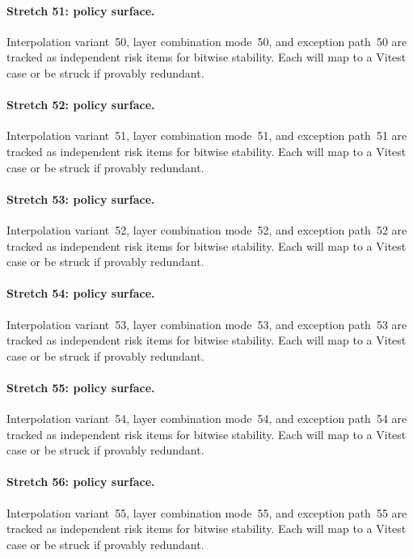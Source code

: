 \documentclass[sigconf,nonacm]{acmart}
\begin{document}
\paragraph{Stretch 51: policy surface.}
Interpolation variant~50, layer combination mode~50, and exception path~50 are tracked as independent risk items for bitwise stability. Each will map to a Vitest case or be struck if provably redundant. %

\paragraph{Stretch 52: policy surface.}
Interpolation variant~51, layer combination mode~51, and exception path~51 are tracked as independent risk items for bitwise stability. Each will map to a Vitest case or be struck if provably redundant. %

\paragraph{Stretch 53: policy surface.}
Interpolation variant~52, layer combination mode~52, and exception path~52 are tracked as independent risk items for bitwise stability. Each will map to a Vitest case or be struck if provably redundant. %

\paragraph{Stretch 54: policy surface.}
Interpolation variant~53, layer combination mode~53, and exception path~53 are tracked as independent risk items for bitwise stability. Each will map to a Vitest case or be struck if provably redundant. %

\paragraph{Stretch 55: policy surface.}
Interpolation variant~54, layer combination mode~54, and exception path~54 are tracked as independent risk items for bitwise stability. Each will map to a Vitest case or be struck if provably redundant. %

\paragraph{Stretch 56: policy surface.}
Interpolation variant~55, layer combination mode~55, and exception path~55 are tracked as independent risk items for bitwise stability. Each will map to a Vitest case or be struck if provably redundant. %
\end{document}
